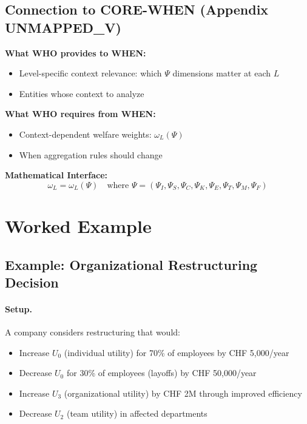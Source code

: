 \subsection{Connection to CORE-WHEN (Appendix UNMAPPED_V)}

\begin{tcolorbox}[colback=yellow!5!white, colframe=yellow!75!black,
    title=Integration: CORE-WHO $\leftrightarrow$ CORE-WHEN]
\textbf{What WHO provides to WHEN:}
\begin{itemize}[nosep]
\item Level-specific context relevance: which $\Psi$ dimensions matter at each $L$
\item Entities whose context to analyze
\end{itemize}

\textbf{What WHO requires from WHEN:}
\begin{itemize}[nosep]
\item Context-dependent welfare weights: $\omega_L(\Psi)$
\item When aggregation rules should change
\end{itemize}

\textbf{Mathematical Interface:}
\begin{equation}
\omega_L = \omega_L(\Psi) \quad \text{where } \Psi = (\Psi_I, \Psi_S, \Psi_C, \Psi_K, \Psi_E, \Psi_T, \Psi_M, \Psi_F)
\end{equation}
\end{tcolorbox}


\section{Worked Example}
\label{sec:who-example}

\subsection{Example: Organizational Restructuring Decision}

\paragraph{Setup.}
A company considers restructuring that would:
\begin{itemize}
\item Increase $U_0$ (individual utility) for 70\% of employees by CHF 5,000/year
\item Decrease $U_0$ for 30\% of employees (layoffs) by CHF 50,000/year
\item Increase $U_3$ (organizational utility) by CHF 2M through improved efficiency
\item Decrease $U_2$ (team utility) in affected departments
\end{itemize}

